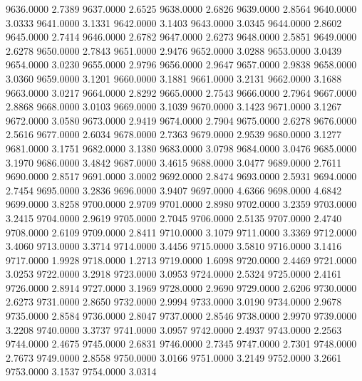 9636.0000      2.7389
9637.0000      2.6525
9638.0000      2.6826
9639.0000      2.8564
9640.0000      3.0333
9641.0000      3.1331
9642.0000      3.1403
9643.0000      3.0345
9644.0000      2.8602
9645.0000      2.7414
9646.0000      2.6782
9647.0000      2.6273
9648.0000      2.5851
9649.0000      2.6278
9650.0000      2.7843
9651.0000      2.9476
9652.0000      3.0288
9653.0000      3.0439
9654.0000      3.0230
9655.0000      2.9796
9656.0000      2.9647
9657.0000      2.9838
9658.0000      3.0360
9659.0000      3.1201
9660.0000      3.1881
9661.0000      3.2131
9662.0000      3.1688
9663.0000      3.0217
9664.0000      2.8292
9665.0000      2.7543
9666.0000      2.7964
9667.0000      2.8868
9668.0000      3.0103
9669.0000      3.1039
9670.0000      3.1423
9671.0000      3.1267
9672.0000      3.0580
9673.0000      2.9419
9674.0000      2.7904
9675.0000      2.6278
9676.0000      2.5616
9677.0000      2.6034
9678.0000      2.7363
9679.0000      2.9539
9680.0000      3.1277
9681.0000      3.1751
9682.0000      3.1380
9683.0000      3.0798
9684.0000      3.0476
9685.0000      3.1970
9686.0000      3.4842
9687.0000      3.4615
9688.0000      3.0477
9689.0000      2.7611
9690.0000      2.8517
9691.0000      3.0002
9692.0000      2.8474
9693.0000      2.5931
9694.0000      2.7454
9695.0000      3.2836
9696.0000      3.9407
9697.0000      4.6366
9698.0000      4.6842
9699.0000      3.8258
9700.0000      2.9709
9701.0000      2.8980
9702.0000      3.2359
9703.0000      3.2415
9704.0000      2.9619
9705.0000      2.7045
9706.0000      2.5135
9707.0000      2.4740
9708.0000      2.6109
9709.0000      2.8411
9710.0000      3.1079
9711.0000      3.3369
9712.0000      3.4060
9713.0000      3.3714
9714.0000      3.4456
9715.0000      3.5810
9716.0000      3.1416
9717.0000      1.9928
9718.0000      1.2713
9719.0000      1.6098
9720.0000      2.4469
9721.0000      3.0253
9722.0000      3.2918
9723.0000      3.0953
9724.0000      2.5324
9725.0000      2.4161
9726.0000      2.8914
9727.0000      3.1969
9728.0000      2.9690
9729.0000      2.6206
9730.0000      2.6273
9731.0000      2.8650
9732.0000      2.9994
9733.0000      3.0190
9734.0000      2.9678
9735.0000      2.8584
9736.0000      2.8047
9737.0000      2.8546
9738.0000      2.9970
9739.0000      3.2208
9740.0000      3.3737
9741.0000      3.0957
9742.0000      2.4937
9743.0000      2.2563
9744.0000      2.4675
9745.0000      2.6831
9746.0000      2.7345
9747.0000      2.7301
9748.0000      2.7673
9749.0000      2.8558
9750.0000      3.0166
9751.0000      3.2149
9752.0000      3.2661
9753.0000      3.1537
9754.0000      3.0314
